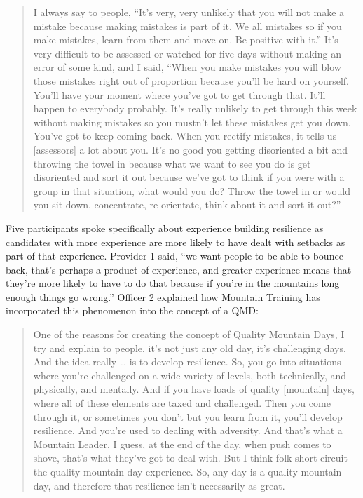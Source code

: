 \documentclass[
  12pt,
  a4paper,
]{book}
\begin{document}
\begin{quote}
I always say to people, ``It's very, very unlikely that you will not make a mistake because making mistakes is part of it. We all mistakes so if you make mistakes, learn from them and move on. Be positive with it.'' It's very difficult to be assessed or watched for five days without making an error of some kind, and I said, ``When you make mistakes you will blow those mistakes right out of proportion because you'll be hard on yourself. You'll have your moment where you've got to get through that. It'll happen to everybody probably. It's really unlikely to get through this week without making mistakes so you mustn't let these mistakes get you down. You've got to keep coming back. When you rectify mistakes, it tells us {[}assessors{]} a lot about you. It's no good you getting disoriented a bit and throwing the towel in because what we want to see you do is get disoriented and sort it out because we've got to think if you were with a group in that situation, what would you do? Throw the towel in or would you sit down, concentrate, re-orientate, think about it and sort it out?''
\end{quote}

Five participants spoke specifically about experience building resilience as candidates with more experience are more likely to have dealt with setbacks as part of that experience. Provider 1 said, ``we want people to be able to bounce back, that's perhaps a product of experience, and greater experience means that they're more likely to have to do that because if you're in the mountains long enough things go wrong.'' Officer 2 explained how Mountain Training has incorporated this phenomenon into the concept of a QMD:

\begin{quote}
One of the reasons for creating the concept of Quality Mountain Days, I try and explain to people, it's not just any old day, it's challenging days. And the idea really \ldots{} is to develop resilience. So, you go into situations where you're challenged on a wide variety of levels, both technically, and physically, and mentally. And if you have loads of quality {[}mountain{]} days, where all of these elements are taxed and challenged. Then you come through it, or sometimes you don't but you learn from it, you'll develop resilience. And you're used to dealing with adversity. And that's what a Mountain Leader, I guess, at the end of the day, when push comes to shove, that's what they've got to deal with. But I think folk short-circuit the quality mountain day experience. So, any day is a quality mountain day, and therefore that resilience isn't necessarily as great.
\end{quote}
\end{document}
